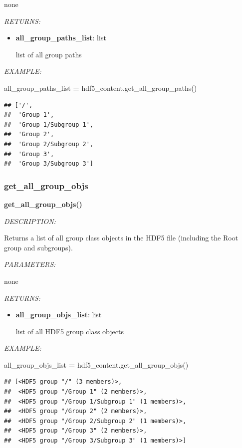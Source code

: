 \documentclass[
]{article}
\newenvironment{Shaded}{\begin{snugshade}}{\end{snugshade}}
\newcommand{\NormalTok}[1]{#1}
\newcommand{\OperatorTok}[1]{\textcolor[rgb]{0.81,0.36,0.00}{\textbf{#1}}}
\begin{document}
none

\emph{RETURNS:}

\begin{itemize}
\item
  \textbf{all\_group\_paths\_list}: list

  list of all group paths
\end{itemize}

\emph{EXAMPLE:}

\begin{Shaded}
\begin{Highlighting}[]
\NormalTok{all_group_paths_list }\OperatorTok{=}\NormalTok{ hdf5_content.get_all_group_paths()}
\end{Highlighting}
\end{Shaded}

\begin{verbatim}
## ['/',
##  'Group 1',
##  'Group 1/Subgroup 1',
##  'Group 2',
##  'Group 2/Subgroup 2',
##  'Group 3',
##  'Group 3/Subgroup 3']
\end{verbatim}

\hypertarget{get_all_group_objs}{%
\subsubsection{get\_all\_group\_objs}\label{get_all_group_objs}}

\textbf{get\_all\_group\_objs()}

\emph{DESCRIPTION:}

Returns a list of all group class objects in the HDF5 file (including the Root group and subgroups).

\emph{PARAMETERS:}

none

\emph{RETURNS:}

\begin{itemize}
\item
  \textbf{all\_group\_objs\_list}: list

  list of all HDF5 group class objects
\end{itemize}

\emph{EXAMPLE:}

\begin{Shaded}
\begin{Highlighting}[]
\NormalTok{all_group_objs_list }\OperatorTok{=}\NormalTok{ hdf5_content.get_all_group_objs()}
\end{Highlighting}
\end{Shaded}

\begin{verbatim}
## [<HDF5 group "/" (3 members)>,
##  <HDF5 group "/Group 1" (2 members)>,
##  <HDF5 group "/Group 1/Subgroup 1" (1 members)>,
##  <HDF5 group "/Group 2" (2 members)>,
##  <HDF5 group "/Group 2/Subgroup 2" (1 members)>,
##  <HDF5 group "/Group 3" (2 members)>,
##  <HDF5 group "/Group 3/Subgroup 3" (1 members)>]
\end{verbatim}
\end{document}
